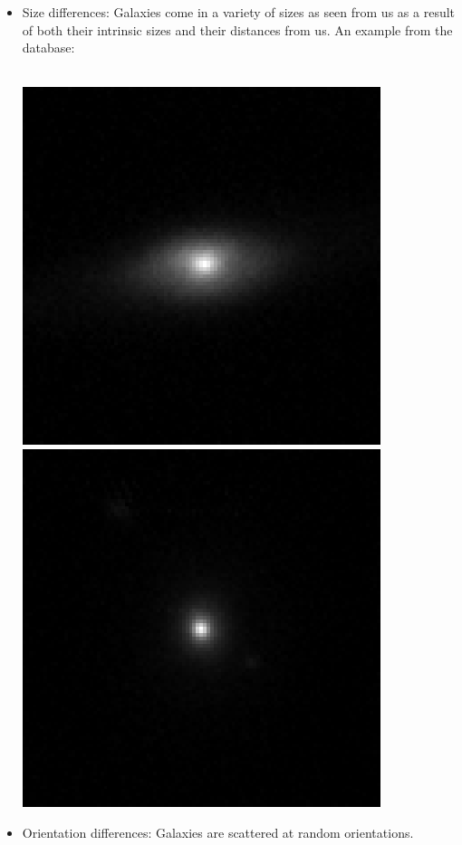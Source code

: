 \documentclass[11pt, a4paper]{article}
\begin{document}
\begin{itemize}
	\begin{itemize}
	\item Size differences: Galaxies come in a variety of sizes as seen from us as a result of both their intrinsic sizes and their distances from us. An example from the database: \\ \\
	\centerline{\includegraphics[scale=0.5]{big_galaxy.png}  \includegraphics[scale=0.5]{small_galaxy.png}}
	\item Orientation differences: Galaxies are scattered at random orientations. \\ \\

\end{itemize}
\end{itemize}
\end{document}
